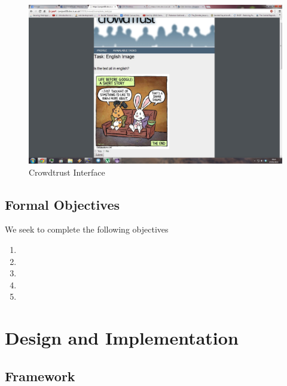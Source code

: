\documentclass[11pt]{article}
\begin{document}
\begin{figure}[H]
\begin{center}
\includegraphics[width=\linewidth]{images/crowdtrustinterface.jpg}
\caption{Crowdtrust Interface}
\label{default}
\end{center}
\end{figure}

\subsection{Formal Objectives}
We seek to complete the following objectives
\begin{enumerate}
\item
\item
\item

\item

\item

\end{enumerate}



\section{Design and Implementation}
\subsection{Framework}
\end{document}
